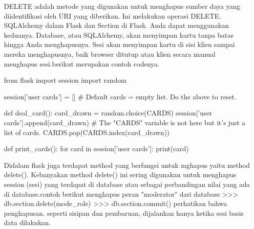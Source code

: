 DELETE adalah metode yang digunakan untuk menghapus sumber daya yang diidentifikasi oleh URI yang diberikan. Ini melakukan operasi DELETE\cite{alemu2014rest}.
SQLAlchemy dalam Flask dan Section di Flask. Anda dapat menggunakan keduanya. Database, atau SQLAlchemy, akan menyimpan kartu tanpa batas hingga Anda menghapusnya. Sesi akan menyimpan kartu di sisi klien sampai mereka menghapusnya, baik browser ditutup atau klien secara manual menghapus sesi.berikut merupakan contoh codenya.

from flask import session
import random

session['user cards'] = []
# Default cards = empty list. Do the above to reset.

def deal_card():
  card_drawn = random.choice(CARDS)
  session['user cards'].append(card_drawn)
  # The "CARDS" variable is not here but it's just a list of cards.
  CARDS.pop(CARDS.index(card_drawn))

def print_cards():
  for card in session['user cards']:
    print(card)

Didalam flask juga terdapat method yang berfungsi untuk mghapus yaitu method delete(). Kebanyakan method delete() ini sering digunakan untuk menghapus session (sesi) yang terdapat di database atau sebagai perbandingan nilai yang ada di database.contoh berikut menghapus peran "moderator" dari database
>>> db.section.delete(mode_role)
>>> db.section.commit()
perhatikan bahwa penghapusan. seperti sisipan dan pembaruan, dijalankan hanya ketika sesi basis data dilakukan\cite{grinberg2018flask}.

